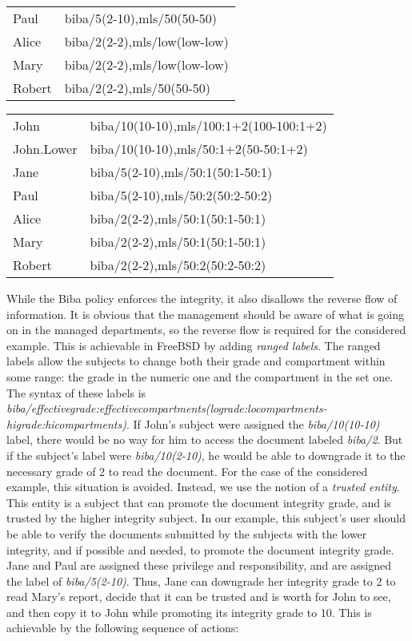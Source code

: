 \documentclass[10pt,a4paper,conference,onecolumn]{IEEEtran}
\newcommand{\KBERcode}[1]{\textsl{#1}}
\begin{document}
\begin{table}[ht]
\begin{tabular}{|l|l|}
Paul & biba/5(2-10),mls/50(50-50)\\
Alice & biba/2(2-2),mls/low(low-low)\\
Mary & biba/2(2-2),mls/low(low-low)\\
Robert &  biba/2(2-2),mls/50(50-50)\\
\hline
\end{tabular}
\hfill
\begin{tabular}{|l|l|}\hline
John & biba/10(10-10),mls/100:1+2(100-100:1+2)\\
John.Lower & biba/10(10-10),mls/50:1+2(50-50:1+2)\\
Jane & biba/5(2-10),mls/50:1(50:1-50:1)\\
Paul & biba/5(2-10),mls/50:2(50:2-50:2)\\
Alice & biba/2(2-2),mls/50:1(50:1-50:1)\\
Mary & biba/2(2-2),mls/50:1(50:1-50:1)\\
Robert & biba/2(2-2),mls/50:2(50:2-50:2)\\
\hline
\end{tabular}
\end{table}

While the Biba policy enforces the integrity, it also disallows the reverse
flow of information. It is obvious that the management should be aware
of what is going on in the managed departments, so the reverse flow is required
for the considered example.
This is achievable in FreeBSD by adding \emph{ranged labels}. The ranged labels
allow the subjects to change both their grade and compartment within some range:
the grade in the numeric one and the compartment in the set one. The syntax of
these labels is 
\KBERcode{biba/effectivegrade:effectivecompartments(lograde:locompartments-higrade:hicompartments)}.
If John's subject were assigned the \KBERcode{biba/10(10-10)} label, there would be
no way for him to access the document labeled \KBERcode{biba/2}. But if the subject's
label were \KBERcode{biba/10(2-10)}, he would be able to downgrade it to
the necessary grade of 2 to read the document. For the case of the considered example,
this situation is avoided. Instead, we use the notion of a \emph{trusted entity}.
This entity is a subject that can promote the document integrity grade,
and is trusted by the higher integrity subject. In our example, this subject's user
should be able to verify the documents submitted by the subjects with the lower integrity, 
and if possible and needed, to promote the document integrity grade.
Jane and Paul are assigned these privilege and responsibility, and are assigned the
label of \KBERcode{biba/5(2-10)}. Thus, Jane can downgrade her integrity grade to
2 to read Mary's report, decide that it can be trusted and is worth for John to see, 
and then copy it to John while promoting its integrity 
grade to 10. This is achievable by the following sequence of actions:
\end{document}
